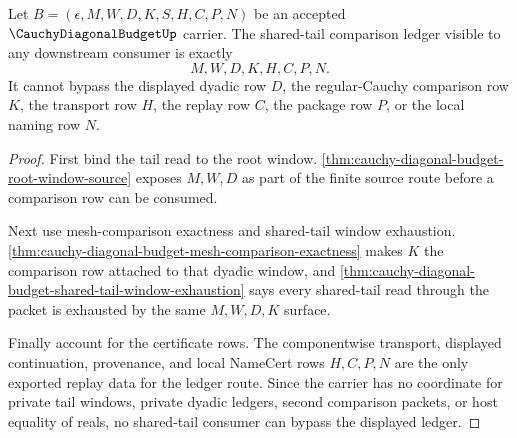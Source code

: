 \begin{theorem}
\label{thm:cauchy-diagonal-budget-tail-ledger-route}
Let $B=(\epsilon,M,W,D,K,S,H,C,P,N)$ be an accepted $\CauchyDiagonalBudgetUp$ carrier. The shared-tail comparison ledger visible to any downstream consumer is exactly
$$
M,W,D,K,H,C,P,N.
$$
It cannot bypass the displayed dyadic row $D$, the regular-Cauchy comparison row $K$, the transport row $H$, the replay row $C$, the package row $P$, or the local naming row $N$.
\end{theorem}
\begin{proof}
First bind the tail read to the root window. \autoref{thm:cauchy-diagonal-budget-root-window-source} exposes $M,W,D$ as part of the finite source route before a comparison row can be consumed.

Next use mesh-comparison exactness and shared-tail window exhaustion. \autoref{thm:cauchy-diagonal-budget-mesh-comparison-exactness} makes $K$ the comparison row attached to that dyadic window, and \autoref{thm:cauchy-diagonal-budget-shared-tail-window-exhaustion} says every shared-tail read through the packet is exhausted by the same $M,W,D,K$ surface.

Finally account for the certificate rows. The componentwise transport, displayed continuation, provenance, and local NameCert rows $H,C,P,N$ are the only exported replay data for the ledger route. Since the carrier has no coordinate for private tail windows, private dyadic ledgers, second comparison packets, or host equality of reals, no shared-tail consumer can bypass the displayed ledger.
\end{proof}

